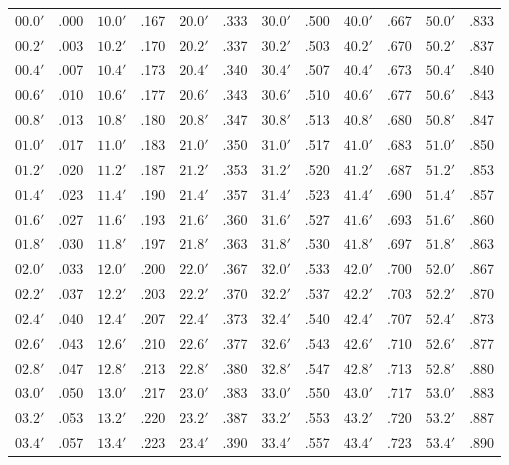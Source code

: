 \clearpage
\begin{table}\centering
{\small\begin{tabular}{ll|ll|ll|ll|ll|ll}
$00.0'$ & .000 & $10.0'$ & .167 & $20.0'$ & .333 & $30.0'$ & .500 & $40.0'$ & .667 & $50.0'$ & .833\\
$00.2'$ & .003 & $10.2'$ & .170 & $20.2'$ & .337 & $30.2'$ & .503 & $40.2'$ & .670 & $50.2'$ & .837\\
$00.4'$ & .007 & $10.4'$ & .173 & $20.4'$ & .340 & $30.4'$ & .507 & $40.4'$ & .673 & $50.4'$ & .840\\
$00.6'$ & .010 & $10.6'$ & .177 & $20.6'$ & .343 & $30.6'$ & .510 & $40.6'$ & .677 & $50.6'$ & .843\\
$00.8'$ & .013 & $10.8'$ & .180 & $20.8'$ & .347 & $30.8'$ & .513 & $40.8'$ & .680 & $50.8'$ & .847\\
$01.0'$ & .017 & $11.0'$ & .183 & $21.0'$ & .350 & $31.0'$ & .517 & $41.0'$ & .683 & $51.0'$ & .850\\
$01.2'$ & .020 & $11.2'$ & .187 & $21.2'$ & .353 & $31.2'$ & .520 & $41.2'$ & .687 & $51.2'$ & .853\\
$01.4'$ & .023 & $11.4'$ & .190 & $21.4'$ & .357 & $31.4'$ & .523 & $41.4'$ & .690 & $51.4'$ & .857\\
$01.6'$ & .027 & $11.6'$ & .193 & $21.6'$ & .360 & $31.6'$ & .527 & $41.6'$ & .693 & $51.6'$ & .860\\
$01.8'$ & .030 & $11.8'$ & .197 & $21.8'$ & .363 & $31.8'$ & .530 & $41.8'$ & .697 & $51.8'$ & .863\\
$02.0'$ & .033 & $12.0'$ & .200 & $22.0'$ & .367 & $32.0'$ & .533 & $42.0'$ & .700 & $52.0'$ & .867\\
$02.2'$ & .037 & $12.2'$ & .203 & $22.2'$ & .370 & $32.2'$ & .537 & $42.2'$ & .703 & $52.2'$ & .870\\
$02.4'$ & .040 & $12.4'$ & .207 & $22.4'$ & .373 & $32.4'$ & .540 & $42.4'$ & .707 & $52.4'$ & .873\\
$02.6'$ & .043 & $12.6'$ & .210 & $22.6'$ & .377 & $32.6'$ & .543 & $42.6'$ & .710 & $52.6'$ & .877\\
$02.8'$ & .047 & $12.8'$ & .213 & $22.8'$ & .380 & $32.8'$ & .547 & $42.8'$ & .713 & $52.8'$ & .880\\
$03.0'$ & .050 & $13.0'$ & .217 & $23.0'$ & .383 & $33.0'$ & .550 & $43.0'$ & .717 & $53.0'$ & .883\\
$03.2'$ & .053 & $13.2'$ & .220 & $23.2'$ & .387 & $33.2'$ & .553 & $43.2'$ & .720 & $53.2'$ & .887\\
$03.4'$ & .057 & $13.4'$ & .223 & $23.4'$ & .390 & $33.4'$ & .557 & $43.4'$ & .723 & $53.4'$ & .890\\

\end{tabular}}
\end{table}
